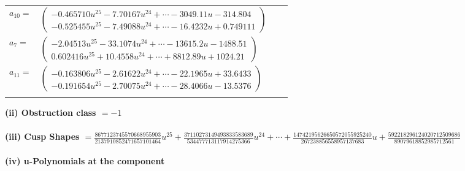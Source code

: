 \documentclass[1p]{elsarticle_modified}
\theoremstyle{definition}
\begin{document}
\begin{tabular}{m{7pt} m{180pt} m{7pt} m{180pt} }
\flushright $a_{10}=$&$\begin{pmatrix}-0.465710 u^{25}-7.70167 u^{24}+\cdots-3049.11 u-314.804\\-0.525455 u^{25}-7.49088 u^{24}+\cdots-16.4232 u+0.749111\end{pmatrix}$ \\
\flushright $a_{7}=$&$\begin{pmatrix}-2.04513 u^{25}-33.1074 u^{24}+\cdots-13615.2 u-1488.51\\0.602416 u^{25}+10.4558 u^{24}+\cdots+8812.89 u+1024.21\end{pmatrix}$ \\
\flushright $a_{11}=$&$\begin{pmatrix}-0.163806 u^{25}-2.61622 u^{24}+\cdots-22.1965 u+33.6433\\-0.191654 u^{25}-2.70075 u^{24}+\cdots-28.4066 u-13.5376\end{pmatrix}$\\&\end{tabular}
\flushleft \textbf{(ii) Obstruction class $= -1$}\\~\\
\flushleft \textbf{(iii) Cusp Shapes $= \frac{8677123745570668955903}{2137910852471657101464} u^{25}+\frac{37110273149493833583689}{534477713117914275366} u^{24}+\cdots+\frac{14742195626650572055925240}{267238856558957137683} u+\frac{592218296124020712509686}{89079618852985712561}$}\\~\\
\newpage\renewcommand{\arraystretch}{1}
\flushleft \textbf{(iv) u-Polynomials at the component}\newline \\
\end{document}
